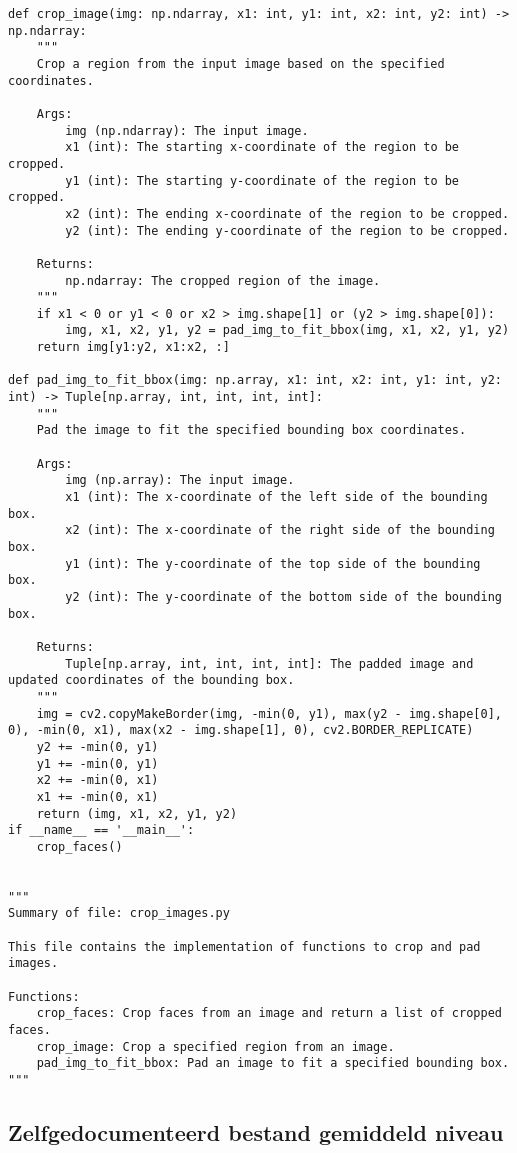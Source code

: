 \begin{verbatim}
def crop_image(img: np.ndarray, x1: int, y1: int, x2: int, y2: int) -> np.ndarray:
    """
    Crop a region from the input image based on the specified coordinates.

    Args:
        img (np.ndarray): The input image.
        x1 (int): The starting x-coordinate of the region to be cropped.
        y1 (int): The starting y-coordinate of the region to be cropped.
        x2 (int): The ending x-coordinate of the region to be cropped.
        y2 (int): The ending y-coordinate of the region to be cropped.

    Returns:
        np.ndarray: The cropped region of the image.
    """
    if x1 < 0 or y1 < 0 or x2 > img.shape[1] or (y2 > img.shape[0]):
        img, x1, x2, y1, y2 = pad_img_to_fit_bbox(img, x1, x2, y1, y2)
    return img[y1:y2, x1:x2, :]

def pad_img_to_fit_bbox(img: np.array, x1: int, x2: int, y1: int, y2: int) -> Tuple[np.array, int, int, int, int]:
    """
    Pad the image to fit the specified bounding box coordinates.

    Args:
        img (np.array): The input image.
        x1 (int): The x-coordinate of the left side of the bounding box.
        x2 (int): The x-coordinate of the right side of the bounding box.
        y1 (int): The y-coordinate of the top side of the bounding box.
        y2 (int): The y-coordinate of the bottom side of the bounding box.

    Returns:
        Tuple[np.array, int, int, int, int]: The padded image and updated coordinates of the bounding box.
    """
    img = cv2.copyMakeBorder(img, -min(0, y1), max(y2 - img.shape[0], 0), -min(0, x1), max(x2 - img.shape[1], 0), cv2.BORDER_REPLICATE)
    y2 += -min(0, y1)
    y1 += -min(0, y1)
    x2 += -min(0, x1)
    x1 += -min(0, x1)
    return (img, x1, x2, y1, y2)
if __name__ == '__main__':
    crop_faces()


"""
Summary of file: crop_images.py

This file contains the implementation of functions to crop and pad images.

Functions:
    crop_faces: Crop faces from an image and return a list of cropped faces.
    crop_image: Crop a specified region from an image.
    pad_img_to_fit_bbox: Pad an image to fit a specified bounding box.
"""
\end{verbatim}

\subsection{Zelfgedocumenteerd bestand gemiddeld niveau}
\label{bijlage:zelfgedocumenteerd-bestand-gemiddeld}

